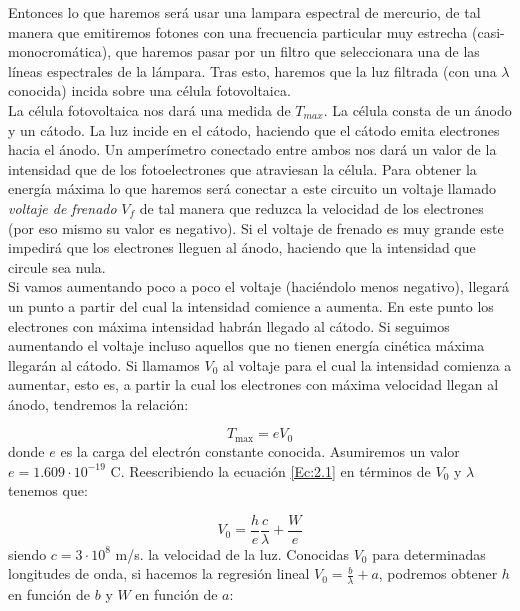 \documentclass[12pt,a4paper]{article}
\numberwithin{equation}{section}
\numberwithin{table}{section}
\numberwithin{figure}{section}
\begin{document}
Entonces lo que haremos será usar una lampara espectral de mercurio, de tal manera que emitiremos fotones con una frecuencia particular muy estrecha (casi-monocromática), que haremos pasar por un filtro que seleccionara una de las líneas espectrales de la lámpara. Tras esto, haremos que la luz filtrada (con una $\lambda$ conocida) incida sobre una célula fotovoltaica.  \\

La célula fotovoltaica nos dará una medida de $T_{max}$. La célula consta de un ánodo y un cátodo. La luz incide en el cátodo, haciendo que el cátodo emita electrones hacia el ánodo. Un amperímetro conectado entre ambos nos dará un valor de la intensidad que de los fotoelectrones que atraviesan la célula. Para obtener la energía máxima lo que haremos será conectar a este circuito un voltaje llamado \textit{voltaje de frenado} $V_f$ de tal manera que reduzca la velocidad de los electrones (por eso mismo su valor es negativo). Si el voltaje de frenado es muy grande este impedirá que los electrones lleguen al ánodo, haciendo que la intensidad que circule sea nula. \\

Si vamos aumentando poco a poco el voltaje (haciéndolo menos negativo), llegará un punto a partir del cual la intensidad comience a aumenta. En este punto los electrones con máxima intensidad habrán llegado al cátodo. Si seguimos aumentando el voltaje incluso aquellos que no tienen energía cinética máxima llegarán al cátodo. Si llamamos $V_0$ al voltaje para el cual la intensidad comienza a aumentar, esto es, a partir la cual los electrones con máxima velocidad llegan al ánodo, tendremos la relación:

\begin{equation}
T_{\max} = eV_0 
\end{equation}
donde $e$ es la carga del electrón constante conocida. Asumiremos un valor $e=1.609\cdot 10^{-19}$ C. Reescribiendo la ecuación \ref{Ec:2.1} en términos de $V_0$ y $\lambda$ tenemos que:

\begin{equation}
V_0 = \frac{h}{e} \frac{c}{\lambda} +  \frac{W}{e}
\end{equation}
siendo $c=3\cdot10^8$ m/s. la velocidad de la luz. Conocidas $V_0$ para determinadas longitudes de onda, si hacemos la regresión lineal $V_0 = \frac{b}{\lambda}+a$, podremos obtener $h$ en función de $b$ y $W$ en función de $a$:
\end{document}
